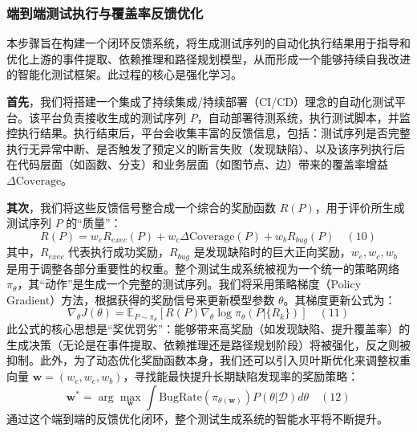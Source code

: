 \documentclass[12pt]{article}
\begin{document}
\subsubsection{端到端测试执行与覆盖率反馈优化}

本步骤旨在构建一个闭环反馈系统，将生成测试序列的自动化执行结果用于指导和优化上游的事件提取、依赖推理和路径规划模型，从而形成一个能够持续自我改进的智能化测试框架。此过程的核心是强化学习。

\textbf{首先}，我们将搭建一个集成了持续集成/持续部署（CI/CD）理念的自动化测试平台。该平台负责接收生成的测试序列 $P$，自动部署待测系统，执行测试脚本，并监控执行结果。执行结束后，平台会收集丰富的反馈信息，包括：测试序列是否完整执行无异常中断、是否触发了预定义的断言失败（发现缺陷）、以及该序列执行后在代码层面（如函数、分支）和业务层面（如图节点、边）带来的覆盖率增益 $\Delta\text{Coverage}$。

\textbf{其次}，我们将这些反馈信号整合成一个综合的奖励函数 $R(P)$，用于评价所生成测试序列 $P$ 的“质量”：
$$
R(P) = w_e R_{exec}(P) + w_c \Delta\text{Coverage}(P) + w_b R_{bug}(P) \quad (10)
$$
其中，$R_{exec}$ 代表执行成功奖励，$R_{bug}$ 是发现缺陷时的巨大正向奖励，$w_e, w_c, w_b$ 是用于调整各部分重要性的权重。整个测试生成系统被视为一个统一的策略网络 $\pi_{\theta}$，其“动作”是生成一个完整的测试序列。我们将采用策略梯度（Policy Gradient）方法，根据获得的奖励信号来更新模型参数 $\theta$。其梯度更新公式为：
$$
\nabla_{\theta} J(\theta) = \mathbb{E}_{P \sim \pi_{\theta}} [R(P) \nabla_{\theta} \log \pi_{\theta}(P | \{R_k\})] \quad (11)
$$
此公式的核心思想是“奖优罚劣”：能够带来高奖励（如发现缺陷、提升覆盖率）的生成决策（无论是在事件提取、依赖推理还是路径规划阶段）将被强化，反之则被抑制。此外，为了动态优化奖励函数本身，我们还可以引入贝叶斯优化来调整权重向量 $\mathbf{w} = (w_e, w_c, w_b)$，寻找能最快提升长期缺陷发现率的奖励策略：
$$
\mathbf{w}^* = \arg\max_{\mathbf{w}} \int \text{BugRate}(\pi_{\theta(\mathbf{w})}) P(\theta|\mathcal{D}) d\theta \quad (12)
$$
通过这个端到端的反馈优化闭环，整个测试生成系统的智能水平将不断提升。
\end{document}
